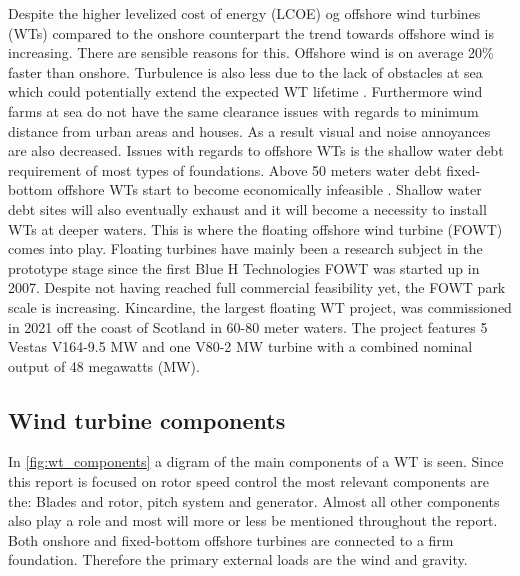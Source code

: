 Despite the higher levelized cost of energy (LCOE) og offshore wind turbines (WTs) compared to the onshore counterpart the trend towards offshore wind is increasing. There are sensible reasons for this. Offshore wind is on average 20\% faster than onshore. Turbulence is also less due to the lack of obstacles at sea which could potentially extend the expected WT lifetime \cite{Christiansen2013}. Furthermore wind farms at sea do not have the same clearance issues with regards to minimum distance from urban areas and houses. As a result visual and noise annoyances are also decreased. Issues with regards to offshore WTs is the shallow water debt requirement of most types of foundations. Above 50 meters water debt fixed-bottom offshore WTs start to become economically infeasible \cite{Lefebvre2012}. Shallow water debt sites will also eventually exhaust and it will become a necessity to install WTs at deeper waters. This is where the floating offshore wind turbine (FOWT) comes into play. Floating turbines have mainly been a research subject in the prototype stage since the first Blue H Technologies FOWT was started up in 2007. Despite not having reached full commercial feasibility yet, the FOWT park scale is increasing. Kincardine, the largest floating WT project, was commissioned in 2021 off the coast of Scotland in 60-80 meter waters. The project features 5 Vestas V164-9.5 MW and one V80-2 MW turbine with a combined nominal output of 48 megawatts (MW). 

\subsection{Wind turbine components}
In \cref{fig:wt_components} a digram of the main components of a WT is seen. Since this report is focused on rotor speed control the most relevant components are the: Blades and rotor, pitch system and generator. Almost all other components also play a role and most will more or less be mentioned throughout the report. Both onshore and fixed-bottom offshore turbines are connected to a firm foundation. Therefore the primary external loads are the wind and gravity. 

